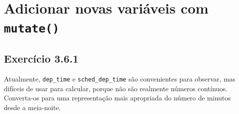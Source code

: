 \documentclass[
]{latex/krantz}
\theoremstyle{definition}
\theoremstyle{definition}
\theoremstyle{definition}
\theoremstyle{definition}
\theoremstyle{remark}
\begin{document}
\hypertarget{adicionar-novas-variuxe1veis-com-mutate}{%
\section{\texorpdfstring{Adicionar novas variáveis com \texttt{mutate()}}{Adicionar novas variáveis com mutate()}}\label{adicionar-novas-variuxe1veis-com-mutate}}

\hypertarget{exr3-6-1}{%
\subsection*{Exercício 3.6.1}\label{exr3-6-1}}

Atualmente, \texttt{dep\_time} e \texttt{sched\_dep\_time} são convenientes para observar, mas difíceis de usar para calcular, porque não são realmente números contínuos. Converta-os para uma representação mais apropriada do número de minutos desde a meia-noite.
\end{document}
